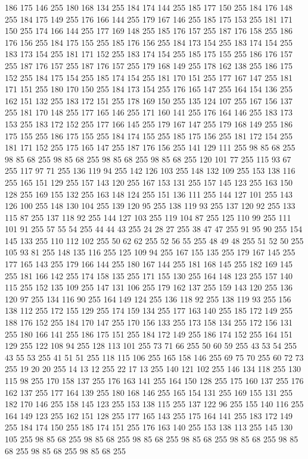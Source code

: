 186 175 146 255 180 168 134 255 184 174 144 255 185 177 150 255 184 176 148 255 184 175 149 255 176 166 144 255 179 167 146 255 185 175 153 255 181 171 150 255 174 166 144 255 177 169 148 255 185 176 157 255 187 176 158 255 186 176 156 255 184 175 155 255 185 176 156 255 184 173 154 255 183 174 154 255 183 173 154 255 181 171 152 255 183 174 154 255 185 175 155 255 186 176 157 255 187 176 157 255 187 176 157 255 179 168 149 255 178 162 138 255 186 175 152 255 184 175 154 255 185 174 154 255 181 170 151 255 177 167 147 255 181 171 151 255 180 170 150 255 184 173 154 255 176 165 147 255 164 154 136 255 162 151 132 255 183 172 151 255 178 169 150 255 135 124 107 255 167 156 137 255 181 170 148 255 177 165 146 255 171 160 141 255 176 164 146 255 183 173 153 255 183 172 152 255 177 166 145 255 179 167 147 255 179 168 149 255 186 175 155 255 186 175 155 255 184 174 155 255 185 175 156 255 181 172 154 255 181 171 152 255 175 165 147 255 187 176 156 255 141 129 111 255 98 85 68 255 98 85 68 255 98 85 68 255
98 85 68 255 98 85 68 255 120 101 77 255 115 93 67 255 117 97 71 255 136 119 94 255 142 126 103 255 148 132 109 255 153 138 116 255 165 151 129 255 157 143 120 255 167 153 131 255 157 145 123 255 163 150 128 255 169 155 132 255 163 148 124 255 151 136 111 255 144 127 101 255 143 126 100 255 148 130 104 255 139 120 95 255 138 119 93 255 137 120 92 255 133 115 87 255 137 118 92 255 144 127 103 255 119 104 87 255 125 110 99 255 111 101 91 255 57 55 54 255 44 44 43 255 24 28 27 255 38 47 47 255 91 95 90 255 154 145 133 255 110 112 102 255 50 62 62 255 52 56 55 255 48 49 48 255 51 52 50 255 105 93 81 255 148 135 116 255 125 109 94 255 167 155 135 255 179 167 145 255 177 165 143 255 179 166 144 255 180 167 144 255 181 168 145 255 182 169 145 255 181 166 142 255 174 158 135 255 171 155 130 255 164 148 123 255 157 140 115 255 152 135 109 255 147 131 106 255 179 162 137 255 159 143 120 255 136 120 97 255 134 116 90 255 164 149 124 255 136 118 92 255 138 119 93 255
156 138 112 255 172 155 129 255 174 159 134 255 177 163 140 255 185 172 149 255 188 176 152 255 184 170 147 255 170 156 133 255 173 158 134 255 172 156 131 255 180 166 141 255 186 175 151 255 184 172 149 255 186 174 152 255 164 151 129 255 122 108 94 255 128 113 101 255 73 71 66 255 50 60 59 255 43 53 54 255 43 55 53 255 41 51 51 255 118 115 106 255 165 158 146 255 69 75 70 255 60 72 73 255 19 20 20 255 14 13 12 255 22 17 13 255 140 121 102 255 146 134 118 255 130 115 98 255 170 158 137 255 176 163 141 255 164 150 128 255 175 160 137 255 176 162 137 255 177 164 139 255 180 168 146 255 165 154 131 255 169 155 131 255 182 170 146 255 158 145 123 255 153 138 115 255 137 122 96 255 155 140 116 255 164 149 123 255 162 151 128 255 177 165 143 255 175 164 141 255 183 172 149 255 184 174 150 255 185 174 151 255 176 163 140 255 153 138 113 255 145 130 105 255 98 85 68 255 98 85 68 255 98 85 68 255 98 85 68 255 98 85 68 255 98 85 68 255 98 85 68 255 98 85 68 255

